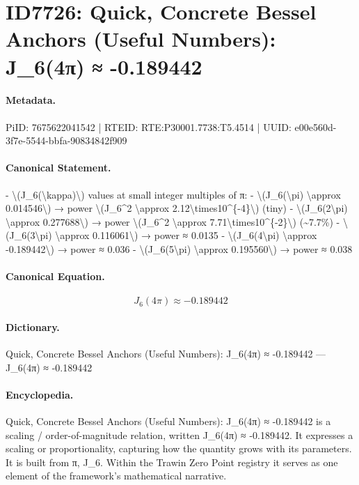 \section*{ID7726: Quick, Concrete Bessel Anchors (Useful Numbers): J\_6(4π) ≈ -0.189442}
\paragraph{Metadata.}
PiID: 7675622041542 | RTEID: RTE:P30001.7738:T5.4514 | UUID: e00e560d-3f7e-5544-bbfa-90834842f909

\paragraph{Canonical Statement.}
- \textbackslash{}(J\_6(\textbackslash{}kappa)\textbackslash{}) values at small integer multiples of π: - \textbackslash{}(J\_6(\textbackslash{}pi) \textbackslash{}approx 0.014546\textbackslash{}) → power \textbackslash{}(J\_6\textasciicircum{}2 \textbackslash{}approx 2.12\textbackslash{}times10\textasciicircum{}\{-4\}\textbackslash{}) (tiny) - \textbackslash{}(J\_6(2\textbackslash{}pi) \textbackslash{}approx 0.277688\textbackslash{}) → power \textbackslash{}(J\_6\textasciicircum{}2 \textbackslash{}approx 7.71\textbackslash{}times10\textasciicircum{}\{-2\}\textbackslash{}) (\textasciitilde{}7.7\%) - \textbackslash{}(J\_6(3\textbackslash{}pi) \textbackslash{}approx 0.116061\textbackslash{}) → power ≈ 0.0135 - \textbackslash{}(J\_6(4\textbackslash{}pi) \textbackslash{}approx -0.189442\textbackslash{}) → power ≈ 0.036 - \textbackslash{}(J\_6(5\textbackslash{}pi) \textbackslash{}approx 0.195560\textbackslash{}) → power ≈ 0.038

\paragraph{Canonical Equation.}
\[
J_6(4\pi) \approx -0.189442
\]

\paragraph{Dictionary.}
Quick, Concrete Bessel Anchors (Useful Numbers): J\_6(4π) ≈ -0.189442 — J\_6(4π) ≈ -0.189442

\paragraph{Encyclopedia.}
Quick, Concrete Bessel Anchors (Useful Numbers): J\_6(4π) ≈ -0.189442 is a scaling / order-of-magnitude relation, written J\_6(4π) ≈ -0.189442. It expresses a scaling or proportionality, capturing how the quantity grows with its parameters. It is built from π, J\_6. Within the Trawin Zero Point registry it serves as one element of the framework's mathematical narrative.

